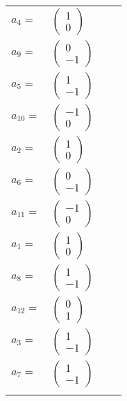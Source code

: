 \documentclass[1p]{elsarticle_modified}
\theoremstyle{definition}
\begin{document}
\begin{tabular}{m{7pt} m{180pt} m{7pt} m{180pt} }
\flushright $a_{4}=$&$\begin{pmatrix}1\\0\end{pmatrix}$ \\
\flushright $a_{9}=$&$\begin{pmatrix}0\\-1\end{pmatrix}$ \\
\flushright $a_{5}=$&$\begin{pmatrix}1\\-1\end{pmatrix}$ \\
\flushright $a_{10}=$&$\begin{pmatrix}-1\\0\end{pmatrix}$ \\
\flushright $a_{2}=$&$\begin{pmatrix}1\\0\end{pmatrix}$ \\
\flushright $a_{6}=$&$\begin{pmatrix}0\\-1\end{pmatrix}$ \\
\flushright $a_{11}=$&$\begin{pmatrix}-1\\0\end{pmatrix}$ \\
\flushright $a_{1}=$&$\begin{pmatrix}1\\0\end{pmatrix}$ \\
\flushright $a_{8}=$&$\begin{pmatrix}1\\-1\end{pmatrix}$ \\
\flushright $a_{12}=$&$\begin{pmatrix}0\\1\end{pmatrix}$ \\
\flushright $a_{3}=$&$\begin{pmatrix}1\\-1\end{pmatrix}$ \\
\flushright $a_{7}=$&$\begin{pmatrix}1\\-1\end{pmatrix}$\\&\end{tabular}
\end{document}
